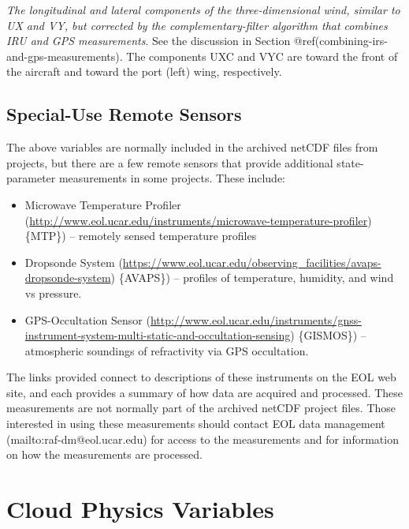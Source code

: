 \documentclass[
  english,
]{book}
\providecommand{\tightlist}{%
  \setlength{\itemsep}{0pt}\setlength{\parskip}{0pt}}
\begin{document}
\emph{The longitudinal and lateral components of the three-dimensional
wind, similar to UX and VY, but corrected by the complementary-filter
algorithm that combines IRU and GPS measurements}. See the discussion in
Section @ref(combining-irs-and-gps-measurements). The components UXC and
VYC are toward the front of the aircraft and toward the port (left)
wing, respectively.

\hypertarget{special-use-remote}{%
\section{Special-Use Remote Sensors}\label{special-use-remote}}

The above variables are normally included in the archived netCDF files
from projects, but there are a few remote sensors that provide
additional state-parameter measurements in some projects. These
include:\protect\hypertarget{subsec:MTP}{}{}

\begin{itemize}
\tightlist
\item
  Microwave Temperature Profiler
  (\url{http://www.eol.ucar.edu/instruments/microwave-temperature-profiler})
  \{MTP\}) -- remotely sensed temperature profiles\\
\item
  Dropsonde System
  (\url{https://www.eol.ucar.edu/observing_facilities/avaps-dropsonde-system})
  \{AVAPS\}) -- profiles of temperature, humidity, and wind vs
  pressure.\\
\item
  GPS-Occultation Sensor
  (\url{http://www.eol.ucar.edu/instruments/gnss-instrument-system-multi-static-and-occultation-sensing})
  \{GISMOS\}) -- atmospheric soundings of refractivity via GPS
  occultation.
\end{itemize}

The links provided connect to descriptions of these instruments on the
EOL web site, and each provides a summary of how data are acquired and
processed. These measurements are not normally part of the archived
netCDF project files. Those interested in using these measurements
should contact EOL data management (mailto:raf-dm@eol.ucar.edu) for
access to the measurements and for information on how the measurements
are processed.

\hypertarget{cloud-physics-variables}{%
\chapter{Cloud Physics Variables}\label{cloud-physics-variables}}
\end{document}

